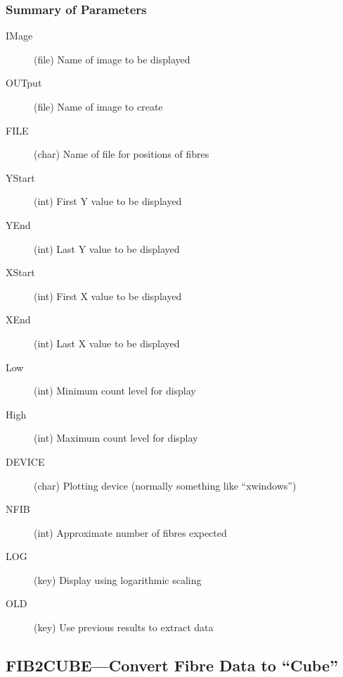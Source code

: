 \subsubsection{Summary of Parameters}

\begin{description}
\item[IMage] (file) Name of image to be displayed
\item[OUTput] (file) Name of image to create
\item[FILE] (char) Name of file for positions of fibres
\item[YStart] (int) First Y value to be displayed
\item[YEnd] (int) Last Y value to be displayed
\item[XStart] (int) First X value to be displayed
\item[XEnd] (int) Last X value to be displayed
\item[Low] (int) Minimum count level for display
\item[High] (int) Maximum count level for display
\item[DEVICE] (char) Plotting device (normally something like ``xwindows'')
\item[NFIB] (int) Approximate number of fibres expected
\item[LOG] (key) Display using logarithmic scaling
\item[OLD] (key) Use previous results to extract data
\end{description}

\subsection{FIB2CUBE---Convert Fibre Data to ``Cube''}

